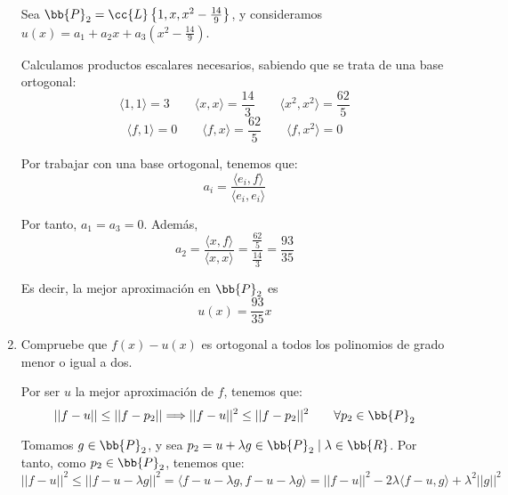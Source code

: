 \begin{ejercicio}
\begin{enumerate}
        Sea $\bb{P}_2=\cc{L}\left\{1,x,x^2-\frac{14}{9}\right\}$, y consideramos $u(x)=a_1 + a_2x + a_3\left(x^2-\frac{14}{9}\right)$.

        Calculamos productos escalares necesarios, sabiendo que se trata de una base ortogonal:
        \begin{equation*}
            \langle 1,1\rangle = 3 \qquad
            \langle x,x\rangle = \frac{14}{3} \qquad
            \langle x^2, x^2\rangle = \frac{62}{5}
        \end{equation*}
        \begin{equation*}
            \langle f,1\rangle = 0 \qquad
            \langle f,x\rangle = \frac{62}{5} \qquad
            \langle f, x^2\rangle = 0
        \end{equation*}

        Por trabajar con una base ortogonal, tenemos que:
        \begin{equation*}
            a_i = \frac{\langle e_i, f\rangle}{\langle e_i, e_i \rangle}
        \end{equation*}

        Por tanto, $a_1=a_3 = 0$. Además,
        \begin{equation*}
            a_2 = \frac{\langle x, f\rangle}{\langle x,x \rangle} = \frac{\frac{62}{5}}{\frac{14}{3}} = \frac{93}{35}
        \end{equation*}
        
        Es decir, la mejor aproximación en $\bb{P}_2$ es $$u(x)=\frac{93}{35}x$$
        
        \item Compruebe que $f(x) - u(x)$ es ortogonal a todos los polinomios de grado menor o igual a dos.

        Por ser $u$ la mejor aproximación de $f$, tenemos que:
        \begin{equation*}
            ||f-u||\leq ||f-p_2|| \Longrightarrow ||f-u||^2\leq ||f-p_2||^2 \qquad \forall p_2\in \bb{P}_2
        \end{equation*}

        Tomamos $g\in \bb{P}_2$, y sea $p_2=u+\lambda g \in \bb{P}_2 \mid \lambda \in \bb{R}$. Por tanto, como $p_2 \in \bb{P}_2$, tenemos que:
        \begin{equation*}
            ||f-u||^2\leq ||f-u-\lambda g||^2 = \langle f-u-\lambda g, f-u-\lambda g\rangle = ||f-u||^2 -2\lambda \langle f-u,g\rangle +\lambda^2 ||g||^2
        \end{equation*}


\end{enumerate}
\end{ejercicio}

